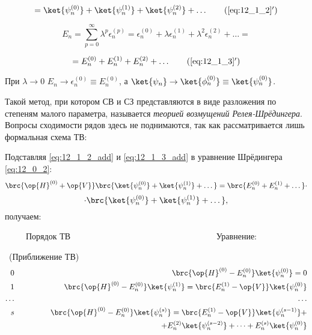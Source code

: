 \begin{equation}
\label{eq:12_1_2_add}
= \ket{\psi_n^{(0)}} + \ket{\psi_n^{(1)}} + \ket{\psi_n^{(2)}} + \dots
\tag{\ref{eq:12_1_2}$'$}
\end{equation}

\begin{equation}
\label{eq:12_1_3}
E_n = \sum_{p=0}^{\infty} \lambda^p \epsilon_n^{(p)} = \epsilon_n^{(0)} + \lambda \epsilon_n^{(1)} + \lambda^2 \epsilon_n^{(2)} + \dots = 
\end{equation}

\begin{equation}
\label{eq:12_1_3_add}
= E_n^{(0)} + E_n^{(1)} + E_n^{(2)} + \dots
\tag{\ref{eq:12_1_3}$'$}
\end{equation}

При $\lambda \to 0$ $E_n \to \epsilon_n^{(0)} \equiv E_n^{(0)}$, а $\ket{\psi_n} \to \ket{\phi_n^{(0)}} \equiv \ket{\psi_n^{(0)}}$.

Такой метод, при котором СВ и СЗ представляются в виде разложения по степеням малого параметра, называется {\em теорией возмущений Релея-Шрёдингера}. Вопросы сходимости рядов здесь не поднимаются, так как рассматривается лишь формальная схема ТВ:

Подставляя \eqref{eq:12_1_2_add} и \eqref{eq:12_1_3_add} в уравнение Шрёдингера \eqref{eq:12_0_2}:
$$
\brc{\op{H}^{(0)} + \op{V}} \brc{\ket{\psi_n^{(0)}} + \ket{\psi_n^{(1)}} + \dots} = \brc{E_n^{(0)} + E_n^{(1)} + \dots} \cdot
$$
$$
\cdot \brc{\ket{\psi_n^{(0)}} + \ket{\psi_n^{(1)}} + \dots},
$$
получаем:

~~~~~Порядок ТВ ~~~~~~~~~~~~~~~~~~~~~~~~~~~~~~~~~~Уравнение:

~(Приближение ТВ)
\begin{eqnarray}
\label{eq:12_1_4} 0 &~~~~~~~~~~~& \brc{\op{H}^{(0)} - E_n^{(0)}} \ket{\psi_n^{(0)}} = 0\\
\label{eq:12_1_5} 1 &~~~~~~~~~~~& \brc{\op{H}^{(0)} - E_n^{(0)}} \ket{\psi_n^{(1)}} = \brc{E_n^{(1)} - \op{V}} \ket{\psi_n^{(0)}} \\
\dots &~&~~~~~~~~~\dots \nonumber \\
 \label{eq:12_1_6} s&~& \brc{\op{H}^{(0)} - E_n^{(0)}} \ket{\psi_n^{(s)}} = \brc{E_n^{(1)} - \op{V}} \ket{\psi_n^{(s-1)}}  + \\
                     &~&+ E_n^{(2)}\ket{\psi_n^{(s-2)}}+\dots+ E_n^{(s)}\ket{\psi_n^{(0)}} \nonumber
\end{eqnarray}

